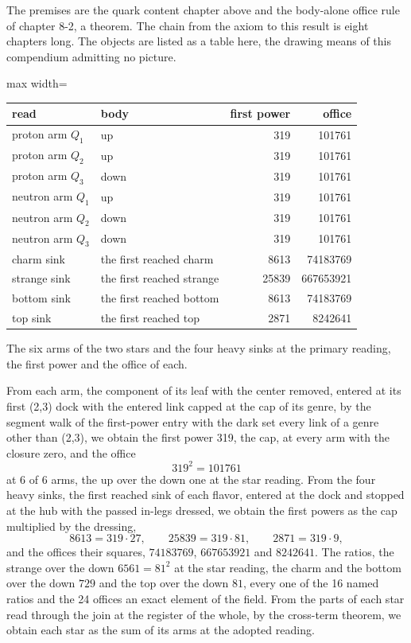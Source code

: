 \begin{chproof}[exact]
The premises are the quark content chapter above and the body-alone office rule of chapter 8-2, a theorem. The chain from the axiom to this result is eight chapters long. The objects are listed as a table here, the drawing means of this compendium admitting no picture.
\begin{center}\small
\begin{adjustbox}{max width=\linewidth}\begin{tabular}{llrr}
\hline
read & body & first power & office \\
\hline
proton arm $Q_1$ & up & 319 & 101761 \\
proton arm $Q_2$ & up & 319 & 101761 \\
proton arm $Q_3$ & down & 319 & 101761 \\
neutron arm $Q_1$ & up & 319 & 101761 \\
neutron arm $Q_2$ & down & 319 & 101761 \\
neutron arm $Q_3$ & down & 319 & 101761 \\
charm sink & the first reached charm & 8613 & 74183769 \\
strange sink & the first reached strange & 25839 & 667653921 \\
bottom sink & the first reached bottom & 8613 & 74183769 \\
top sink & the first reached top & 2871 & 8242641 \\
\hline
\end{tabular}\end{adjustbox}

The six arms of the two stars and the four heavy sinks at the primary reading, the first power and the office of each.
\end{center}
From each arm, the component of its leaf with the center removed, entered at its first (2,3) dock with the entered link capped at the cap of its genre, by the segment walk of the first-power entry with the dark set every link of a genre other than (2,3), we obtain the first power 319, the cap, at every arm with the closure zero, and the office
\begin{equation}
319^{2} = 101761
\end{equation}
at 6 of 6 arms, the up over the down one at the star reading. From the four heavy sinks, the first reached sink of each flavor, entered at the dock and stopped at the hub with the passed in-legs dressed, we obtain the first powers as the cap multiplied by the dressing,
\begin{equation}
8613 = 319 \cdot 27, \qquad 25839 = 319 \cdot 81, \qquad 2871 = 319 \cdot 9 ,
\end{equation}
and the offices their squares, $74183769$, $667653921$ and $8242641$. The ratios, the strange over the down $6561 = 81^{2}$ at the star reading, the charm and the bottom over the down $729$ and the top over the down $81$, every one of the 16 named ratios and the 24 offices an exact element of the field. From the parts of each star read through the join at the register of the whole, by the cross-term theorem, we obtain each star as the sum of its arms at the adopted reading.


\end{chproof}

